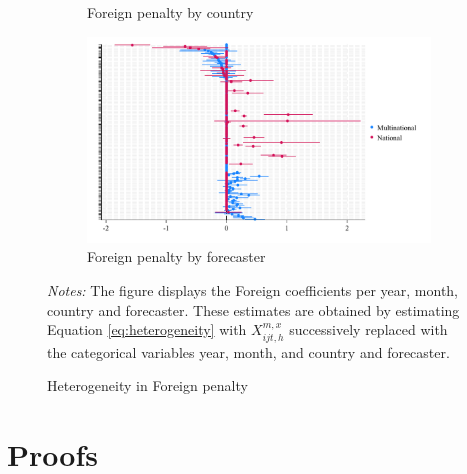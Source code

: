 \documentclass[letterpaper,12pt]{article}
\newenvironment{fignote}{\footnotesize \begin{singlespace} \noindent}{\end{singlespace} \par }
\begin{document}
\begin{landscape}
\begin{figure}[H]
\begin{subfigure}[b]{0.65\textwidth}
		\caption{Foreign penalty by country}
	\end{subfigure}
	\hfill
	\begin{subfigure}[b]{0.65\textwidth}
		\centering
		\includegraphics[width=1\linewidth]{../output/figures/heterogeneity_by_for.pdf}
		\caption{Foreign penalty by forecaster}
	\end{subfigure}
		\caption{Heterogeneity in Foreign penalty}
	\begin{fignote}
		\textit{Notes:} The figure displays the Foreign coefficients per year, month, country and forecaster. These estimates are obtained by estimating Equation \eqref{eq:heterogeneity} with $X_{ijt,h}^{m,x}$ successively replaced with the categorical variables year, month, and country and forecaster.
	\end{fignote}
	\label{fig:heterogeneity}
\end{figure}
\end{landscape}

\newpage
\section{Proofs}


%



\end{document}
